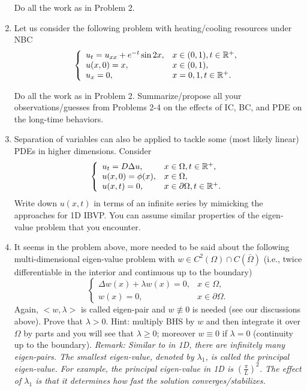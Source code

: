 \documentclass[6pt]{article}
\numberwithin{equation}{section}
\def\mathbb{\Bbb}
\begin{document}
\begin{enumerate}
Do all the work as in Problem 2.


\item  Let us consider the following problem with heating/cooling resources under NBC
\begin{equation}\label{NBVP1}
\left\{
\begin{array}{ll}
u_t=u_{xx}+e^{-t}\sin 2x,& x\in (0,1), t\in\mathbb R^+,\\
u(x,0)=x, &x\in(0,1), \\
u_x=0, & x=0,1, t\in\mathbb R^+.
\end{array}
\right.
\end{equation}

Do all the work as in Problem 2.  Summarize/propose all your observations/guesses from Problems 2-4 on the effects of IC, BC, and PDE on the long-time behaviors.

\item  Separation of variables can also be applied to tackle some (most likely linear) PDEs in higher dimensions.  Consider
\begin{equation}
\left\{
\begin{array}{ll}
u_t=D\Delta u,& x\in\Omega,t\in\mathbb R^+,\\
u(x,0)=\phi(x),&x\in\Omega,\\
u(x,t)=0, &x\in\partial \Omega, t\in\mathbb R^+.
\end{array}
\right.
\end{equation}
Write down $u(x,t)$ in terms of an infinite series by mimicking the approaches for 1D IBVP.  You can assume similar properties of the eigen-value problem that you encounter.

\item It seems in the problem above, more needed to be said about the following multi-dimensional eigen-value problem with $w\in C^2(\Omega)\cap C(\bar\Omega)$ (i.e., twice differentiable in the interior and continuous up to the boundary)
\begin{equation}\label{DEP}
\left\{
\begin{array}{ll}
\Delta w(x)+\lambda w(x)=0,& x\in\Omega,\\
w(x)=0, &x\in\partial \Omega.
\end{array}
\right.
\end{equation}
Again, $<w,\lambda>$ is called eigen-pair and $w\not\equiv0$ is needed (see our discussions above).  Prove that $\lambda>0$.  Hint: multiply BHS by $w$ and then integrate it over $\Omega$ by parts and you will see that $\lambda\geq0$; moreover $w\equiv 0$ if $\lambda=0$ (continuity up to the boundary).  \emph{Remark: Similar to in 1D, there are infinitely many eigen-pairs.  The smallest eigen-value, denoted by $\lambda_1$, is called the principal eigen-value.  For example, the principal eigen-value in 1D is $(\frac{\pi}{L})^2$.  The effect of $\lambda_1$ is that it determines how fast the solution converges/stabilizes. }


\end{enumerate}
\end{document}
